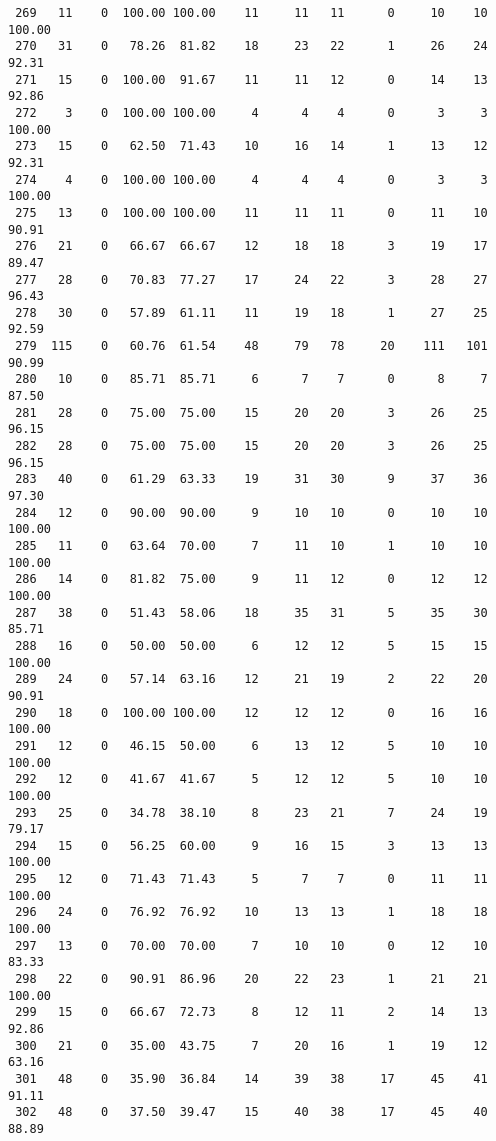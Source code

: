 \begin{verbatim}
 269   11    0  100.00 100.00    11     11   11      0     10    10   100.00
 270   31    0   78.26  81.82    18     23   22      1     26    24    92.31
 271   15    0  100.00  91.67    11     11   12      0     14    13    92.86
 272    3    0  100.00 100.00     4      4    4      0      3     3   100.00
 273   15    0   62.50  71.43    10     16   14      1     13    12    92.31
 274    4    0  100.00 100.00     4      4    4      0      3     3   100.00
 275   13    0  100.00 100.00    11     11   11      0     11    10    90.91
 276   21    0   66.67  66.67    12     18   18      3     19    17    89.47
 277   28    0   70.83  77.27    17     24   22      3     28    27    96.43
 278   30    0   57.89  61.11    11     19   18      1     27    25    92.59
 279  115    0   60.76  61.54    48     79   78     20    111   101    90.99
 280   10    0   85.71  85.71     6      7    7      0      8     7    87.50
 281   28    0   75.00  75.00    15     20   20      3     26    25    96.15
 282   28    0   75.00  75.00    15     20   20      3     26    25    96.15
 283   40    0   61.29  63.33    19     31   30      9     37    36    97.30
 284   12    0   90.00  90.00     9     10   10      0     10    10   100.00
 285   11    0   63.64  70.00     7     11   10      1     10    10   100.00
 286   14    0   81.82  75.00     9     11   12      0     12    12   100.00
 287   38    0   51.43  58.06    18     35   31      5     35    30    85.71
 288   16    0   50.00  50.00     6     12   12      5     15    15   100.00
 289   24    0   57.14  63.16    12     21   19      2     22    20    90.91
 290   18    0  100.00 100.00    12     12   12      0     16    16   100.00
 291   12    0   46.15  50.00     6     13   12      5     10    10   100.00
 292   12    0   41.67  41.67     5     12   12      5     10    10   100.00
 293   25    0   34.78  38.10     8     23   21      7     24    19    79.17
 294   15    0   56.25  60.00     9     16   15      3     13    13   100.00
 295   12    0   71.43  71.43     5      7    7      0     11    11   100.00
 296   24    0   76.92  76.92    10     13   13      1     18    18   100.00
 297   13    0   70.00  70.00     7     10   10      0     12    10    83.33
 298   22    0   90.91  86.96    20     22   23      1     21    21   100.00
 299   15    0   66.67  72.73     8     12   11      2     14    13    92.86
 300   21    0   35.00  43.75     7     20   16      1     19    12    63.16
 301   48    0   35.90  36.84    14     39   38     17     45    41    91.11
 302   48    0   37.50  39.47    15     40   38     17     45    40    88.89

\end{verbatim}
